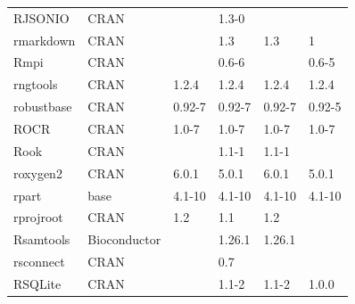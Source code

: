 \begin{longtable}{llllll}
\rowcolor{black!5}
RJSONIO                       & \acrshort{CRAN}                      &             & 1.3-0       &                &                    \\
\rowcolor{black!10}
rmarkdown                     & \acrshort{CRAN}                      &             & 1.3         & 1.3            & 1                 \\
\rowcolor{black!5}
Rmpi                          & \acrshort{CRAN}                      &             & 0.6-6       &                & 0.6-5              \\
\rowcolor{black!10}
rngtools                      & \acrshort{CRAN}                      & 1.2.4       & 1.2.4       & 1.2.4          & 1.2.4             \\
\rowcolor{black!5}
robustbase                    & \acrshort{CRAN}                      & 0.92-7      & 0.92-7      & 0.92-7         & 0.92-5             \\
\rowcolor{black!10}
ROCR                          & \acrshort{CRAN}                      & 1.0-7       & 1.0-7       & 1.0-7          & 1.0-7             \\
\rowcolor{black!5}
Rook                          & \acrshort{CRAN}                      &             & 1.1-1       & 1.1-1          &                    \\
\rowcolor{black!10}
roxygen2                      & \acrshort{CRAN}                      & 6.0.1       & 5.0.1       & 6.0.1          & 5.0.1             \\
\rowcolor{black!5}
rpart                         & base                      & 4.1-10      & 4.1-10      & 4.1-10         & 4.1-10             \\
\rowcolor{black!10}
rprojroot                     & \acrshort{CRAN}                      & 1.2         & 1.1         & 1.2            &                   \\
\rowcolor{black!5}
Rsamtools                     & Bioconductor              &             & 1.26.1      & 1.26.1         &                    \\
\rowcolor{black!10}
rsconnect                     & \acrshort{CRAN}                      &             & 0.7         &                &                   \\
\rowcolor{black!5}
RSQLite                       & \acrshort{CRAN}                      &             & 1.1-2       & 1.1-2          & 1.0.0              \\

\end{longtable}
